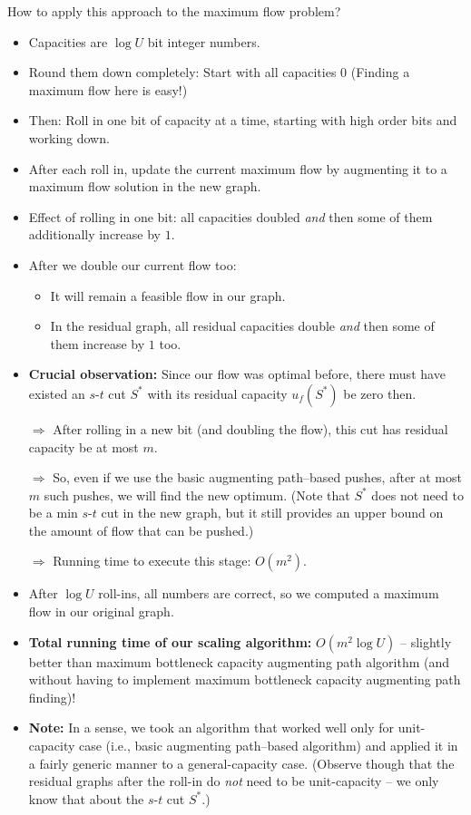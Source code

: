 \documentclass{article}
\begin{document}
How to apply this approach to the maximum flow problem?
\begin{itemize}
\item Capacities are $\log U$ bit integer numbers. 
\item Round them down completely: Start with all capacities $0$ (Finding a maximum flow here is easy!)
\item Then: Roll in one bit of capacity at a time, starting with high order bits
  and working down.
\item After each roll in, update the current maximum flow by augmenting it to a maximum flow solution in the new graph. 
\item Effect of rolling in one bit: all capacities doubled {\em and} then some of them additionally increase by $1$. 
\item After we double our current flow too: 
\begin{itemize}
\item It will remain a feasible flow in our graph. 
\item In the residual graph, all residual capacities double {\em and} then some of them increase by $1$ too. 
\end{itemize}
\item \textbf{Crucial observation:} Since our flow was optimal before, there must have existed an $s$-$t$ cut $S^*$ with its residual capacity $u_f(S^*)$ be zero then.

$\Rightarrow$ After rolling in a new bit (and doubling the flow), this cut has residual capacity be at most $m$. 

$\Rightarrow$ So, even if we use the basic augmenting path--based pushes, after at most $m$ such pushes, we will find the new optimum. (Note that $S^*$ does not need to be a min $s$-$t$ cut in the new graph, but it still provides an upper bound on the amount of flow that can be pushed.)

$\Rightarrow$ Running time to execute this stage: $O(m^2)$. 

\item After $\log U$ roll-ins, all numbers are correct, so we computed a maximum flow in our original graph. 

\item \textbf{Total running time of our scaling algorithm:} $O(m^2 \log U)$ -- slightly better than maximum bottleneck capacity augmenting path algorithm (and without having to implement maximum bottleneck capacity augmenting path finding)!

\item \textbf{Note:} In a sense, we took an algorithm that worked well only for unit-capacity case (i.e., basic augmenting path--based algorithm) and applied it in a fairly generic manner to a general-capacity case. (Observe though that the residual graphs after the roll-in do {\em not} need to be unit-capacity -- we only know that about the $s$-$t$ cut $S^*$.)


\end{itemize}
\end{document}

